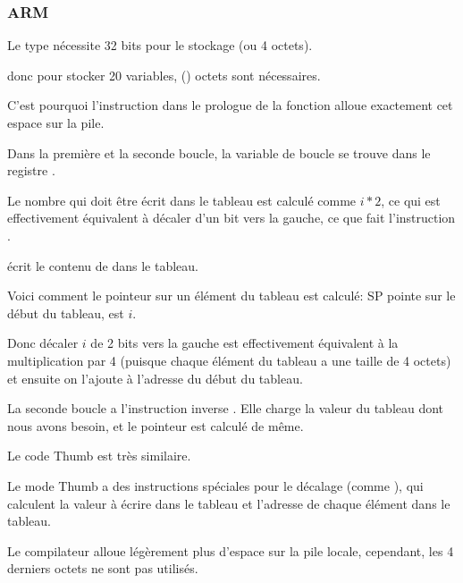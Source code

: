 \subsubsection{ARM}

\myparagraph{\NonOptimizingKeilVI (\ARMMode)}



Le type \Tint nécessite 32 bits pour le stockage (ou 4 octets).

donc pour stocker 20 variables,  () octets sont nécessaires.

C'est pourquoi l'instruction  dans le prologue de la fonction
alloue exactement cet espace sur la pile.

Dans la première et la seconde boucle, la variable de boucle  se trouve dans
le registre .


Le nombre qui doit être écrit dans le tableau est calculé comme $i*2$, ce qui est
effectivement équivalent à décaler d'un bit vers la gauche,
ce que fait l'instruction .

 écrit le contenu de  dans le tableau.

Voici comment le pointeur sur un élément du tableau est calculé: \ac{SP} pointe sur
le début du tableau,  est $i$.

Donc décaler $i$ de 2 bits vers la gauche est effectivement équivalent à la multiplication
par 4 (puisque chaque élément du tableau a une taille de 4 octets) et ensuite on
l'ajoute à l'adresse du début du tableau.


La seconde boucle a l'instruction inverse . Elle charge
la valeur du tableau dont nous avons besoin, et le pointeur est calculé de même.

\myparagraph{\OptimizingKeilVI (\ThumbMode)}



Le code Thumb est très similaire.

Le mode Thumb a des instructions spéciales pour le décalage (comme ), qui
calculent la valeur à écrire dans le tableau et l'adresse de chaque élément dans le
tableau.

Le compilateur alloue légèrement plus d'espace sur la pile locale, cependant, les
4 derniers octets ne sont pas utilisés.




